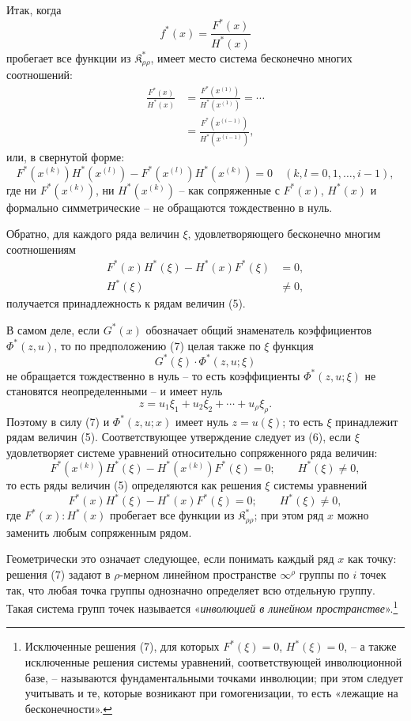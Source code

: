 \documentclass[11pt]{article}
\providecommand{\Kfield}{\mathfrak{K}}
\begin{document}
Итак, когда
\[
  f^*(x)=\frac{F^*(x)}{H^*(x)}
\]
пробегает все функции из $\Kfield^*_{\rho\rho}$, имеет место система бесконечно многих соотношений:
\begin{equation}
\begin{aligned}
  \frac{F^*(x)}{H^*(x)}
  &=\frac{F^*(x^{(1)})}{H^*(x^{(1)})}=\cdots\\
  &=\frac{F^*(x^{(i-1)})}{H^*(x^{(i-1)})},
\end{aligned}
\tag{6}
\end{equation}
или, в свернутой форме:
\[
  F^*(x^{(k)})H^*(x^{(l)})-
  F^*(x^{(l)})H^*(x^{(k)})=0
  \quad(k,l=0,1,\ldots,i-1),
\]
где ни $F^*(x^{(k)})$, ни $H^*(x^{(k)})$ -- как сопряженные с $F^*(x)$, $H^*(x)$ и формально симметрические -- не обращаются тождественно в нуль.

Обратно, для каждого ряда величин $\xi$, удовлетворяющего бесконечно многим соотношениям
\begin{equation}
\begin{aligned}
  F^*(x)H^*(\xi)-H^*(x)F^*(\xi)&=0,\\
  H^*(\xi)&\ne0,
\end{aligned}
\tag{7}
\end{equation}
получается принадлежность к рядам величин (5).

В самом деле, если $G^*(x)$ обозначает общий знаменатель коэффициентов $\Phi^*(z,u)$, то по предположению (7) целая также по $\xi$ функция
\[
  G^*(\xi)\cdot\Phi^*(z,u;\xi)
\]
не обращается тождественно в нуль -- то есть коэффициенты $\Phi^*(z,u;\xi)$ не становятся неопределенными -- и имеет нуль
\[
  z=u_1\xi_1+u_2\xi_2+\cdots+u_\rho\xi_\rho.
\]
Поэтому в силу (7) и $\Phi^*(z,u;x)$ имеет нуль $z=u(\xi)$; то есть $\xi$ принадлежит рядам величин (5). Соответствующее утверждение следует из (6), если $\xi$ удовлетворяет системе уравнений относительно сопряженного ряда величин:
\[
  F^*(x^{(k)})H^*(\xi)-H^*(x^{(k)})F^*(\xi)=0;
  \qquad H^*(\xi)\ne0,
\]
то есть ряды величин (5) определяются как решения $\xi$ системы уравнений
\[
  F^*(x)H^*(\xi)-H^*(x)F^*(\xi)=0;
  \qquad H^*(\xi)\ne0,
\]
где $F^*(x):H^*(x)$ пробегает все функции из $\Kfield^*_{\rho\rho}$; при этом ряд $x$ можно заменить любым сопряженным рядом.

Геометрически это означает следующее, если понимать каждый ряд $x$ как точку: решения (7) задают в $\rho$-мерном линейном пространстве $\infty^\rho$ группы по $i$ точек так, что любая точка группы однозначно определяет всю отдельную группу. Такая система групп точек называется «\emph{инволюцией в линейном пространстве}».\footnote{Исключенные решения (7), для которых $F^*(\xi)=0$, $H^*(\xi)=0$, -- а также исключенные решения системы уравнений, соответствующей инволюционной базе, -- называются фундаментальными точками инволюции; при этом следует учитывать и те, которые возникают при гомогенизации, то есть «лежащие на бесконечности».}
\end{document}
